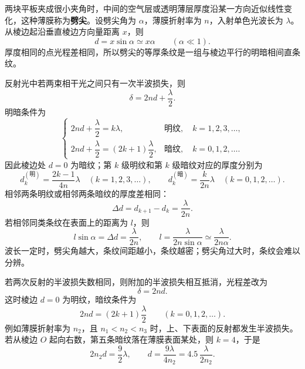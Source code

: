 \documentclass[lang=cn,11pt]{elegantbook}
\begin{document}
\begin{conclusion}[劈尖薄膜的干涉]
两块平板夹成很小夹角时，中间的空气层或透明薄层厚度沿某一方向近似线性变化，这种薄膜称为\textbf{劈尖}。设劈尖角为 \(\alpha\)，薄膜折射率为 \(n\)，入射单色光波长为 \(\lambda\)。从棱边起沿垂直棱边方向量距离 \(x\)，则
\[
d=x\sin\alpha\simeq x\alpha\qquad(\alpha\ll 1).
\]
厚度相同的点光程差相同，所以劈尖的等厚条纹是一组与棱边平行的明暗相间直条纹。

反射光中若两束相干光之间只有一次半波损失，则
\[
\delta=2nd+\frac{\lambda}{2}.
\]
明暗条件为
\[
\begin{cases}
2nd+\dfrac{\lambda}{2}=k\lambda, & \text{明纹},\quad k=1,2,3,\dots,\\[6pt]
2nd+\dfrac{\lambda}{2}=(2k+1)\dfrac{\lambda}{2}, & \text{暗纹},\quad k=0,1,2,\dots.
\end{cases}
\]
因此棱边处 \(d=0\) 为暗纹；第 \(k\) 级明纹和第 \(k\) 级暗纹对应的厚度分别为
\[
d_k^{(\text{明})}=\frac{2k-1}{4n}\lambda\quad(k=1,2,3,\dots),
\qquad
d_k^{(\text{暗})}=\frac{k}{2n}\lambda\quad(k=0,1,2,\dots).
\]
相邻两条明纹或相邻两条暗纹的厚度差相同：
\[
\Delta d=d_{k+1}-d_k=\frac{\lambda}{2n}.
\]
若相邻同类条纹在表面上的距离为 \(l\)，则
\[
l\sin\alpha=\Delta d=\frac{\lambda}{2n},
\qquad
l=\frac{\lambda}{2n\sin\alpha}\simeq \frac{\lambda}{2n\alpha}.
\]
波长一定时，劈尖角越大，条纹间距越小，条纹越密；劈尖角过大时，条纹会难以分辨。

若两次反射的半波损失数相同，则附加的半波损失相互抵消，光程差改为
\[
\delta=2nd.
\]
这时棱边 \(d=0\) 为明纹，暗纹条件为
\[
2nd=(2k+1)\frac{\lambda}{2}\qquad(k=0,1,2,\dots).
\]
例如薄膜折射率为 \(n_2\)，且 \(n_1<n_2<n_3\) 时，上、下表面的反射都发生半波损失。若从棱边 \(O\) 起向右数，第五条暗纹落在薄膜表面某处，则 \(k=4\)，于是
\[
2n_2d=\frac{9}{2}\lambda,
\qquad
d=\frac{9\lambda}{4n_2}
=4.5\,\frac{\lambda}{2n_2}.
\]


\end{conclusion}
\end{document}
